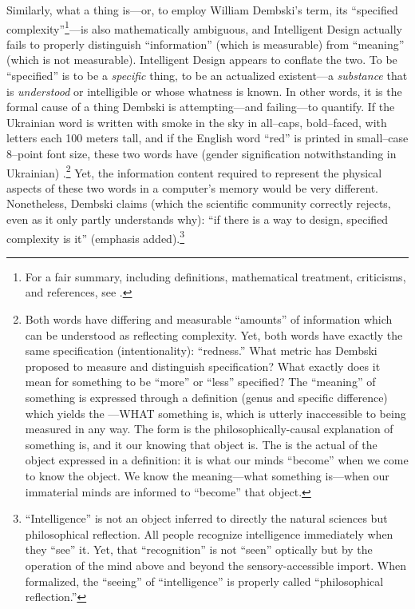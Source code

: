 Similarly, what a thing is---or, to employ William Dembski's term, its ``specified complexity''\footnote{For a fair summary, including definitions, mathematical treatment, criticisms, and references, see \citet{scwp}.}---is also mathematically ambiguous, and Intelligent Design actually fails to properly distinguish ``information'' (which is measurable) from ``meaning'' (which is not measurable).  Intelligent Design appears to conflate the two. To be ``specified'' is to be a \textit{specific} thing, to be an actualized existent---a \textit{substance} that is \textit{understood} or intelligible or whose whatness is known. In other words, it is the formal cause of a thing Dembski is attempting---and failing---to quantify.  If the Ukrainian word  is written with smoke in the sky in all--caps, bold--faced, with letters each 100 meters tall, and if the English word ``red'' is printed in small--case 8--point font size, these two words have (gender signification notwithstanding in Ukrainian) .\footnote{Both words have differing and measurable ``amounts'' of information which can be understood as reflecting complexity. Yet, both words have exactly the same specification (intentionality): ``redness.'' What metric has Dembski proposed to measure and distinguish  specification? What exactly does it mean for something to be  ``more'' or ``less'' specified? The ``meaning'' of something is expressed through a definition (genus and specific difference) which yields the ---WHAT something is, which is utterly inaccessible to being measured in any way. The form is the philosophically-causal explanation of  something is, and it  our knowing  that object is. The  is the actual  of the object expressed in a definition: it is what our minds ``become'' when we come to know the object. We know the meaning---what something is---when our immaterial minds are informed  to ``become'' that object.} Yet, the information content required to represent the physical aspects of these two words in a computer's memory would be very different.  Nonetheless, Dembski claims (which the scientific community correctly rejects, even as it only partly understands why): ``if there is a way to  design, specified complexity is it'' \citep[][p.~19]{dembskinfl} (emphasis added).\footnote{``Intelligence'' is not an object inferred to directly  the natural sciences but  philosophical reflection. All people recognize intelligence immediately when they ``see'' it. Yet, that ``recognition'' is not ``seen'' optically but by the operation of the mind above and beyond the sensory-accessible import. When formalized, the ``seeing'' of ``intelligence'' is properly called ``philosophical reflection.''}

